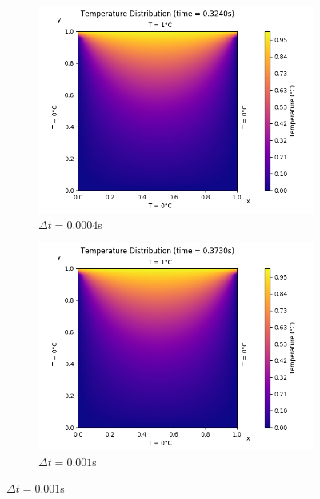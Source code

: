 \documentclass[a4paper]{article}
\begin{document}
		\begin{figure}[H]
			\begin{subfigure}{0.5\textwidth}
				\includegraphics[width=\linewidth]{figures/1a_implicit_dt_varies/1)dt=400ns.png}
				\caption{$\Delta t = 0.0004$s}
			\end{subfigure}\hspace*{\fill}
			\begin{subfigure}{0.5\textwidth}
				\includegraphics[width=\linewidth]{figures/1a_implicit_dt_varies/2)dt=1000ns.png}
				\caption{$\Delta t = 0.001$s}
			\end{subfigure}
			

\end{figure}
\end{document}
